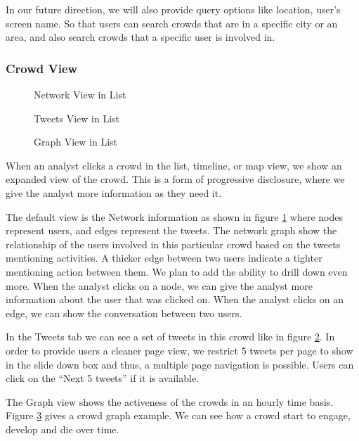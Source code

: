 \documentclass{sig-alternate}
\begin{document}
In our future direction, we will also provide query options like location, user's
screen name. So that users can search crowds that are in a specific city or an 
area, and also search crowds that a specific user is involved in.

\subsubsection{Crowd View}

\begin{figure}
\centering
{}
\caption{Network View in List}
\label{fig:NetworkInList}
\end{figure}

\begin{figure}
\centering
{}
\caption{Tweets View in List}
\label{fig:TweetInList}
\end{figure}

\begin{figure}
\centering
{}
\caption{Graph View in List}
\label{fig:GraphInList}
\end{figure}
When an analyst clicks a crowd in the list, timeline, or map view, we show an
expanded view of the crowd. This is a form of progressive disclosure, where we
give the analyst more information as they need it.  

The default view is the Network information as shown in figure \ref{fig:NetworkInList} where nodes represent users, and edges represent the tweets. The network graph show the relationship of the users involved in this particular crowd based on the tweets mentioning activities. A thicker edge between two users indicate a tighter mentioning action between them. We plan to add the ability to drill down even more.  When the analyst clicks on a node, we can give the analyst more information about the user that was clicked on. When the analyst clicks on an edge, we can show the conversation between two users.

In the Tweets tab we can see a set of tweets in this crowd like in figure \ref{fig:TweetInList}. In order to provide users a cleaner page view, we restrict 5 tweets per page to show in the slide down box and thus, a multiple page navigation is possible. Users can click on the ``Next 5 tweets'' if it is available.

The Graph view shows the activeness of the crowds in an hourly time basis. Figure \ref{fig:GraphInList} gives a crowd graph example. We can see how a crowd start to engage, develop and die over time.
\end{document}
